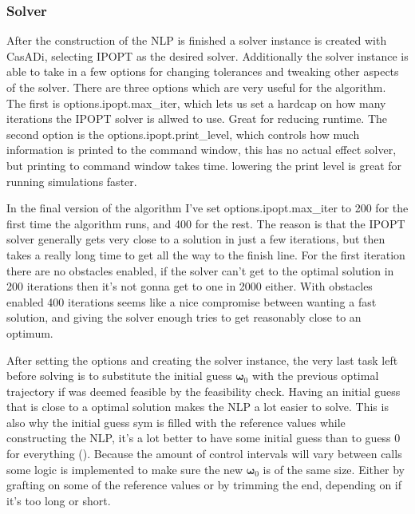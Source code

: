 \subsubsection*{Solver}
After the construction of the \gls{NLP} is finished a solver instance is created with CasADi, selecting \gls{IPOPT}
as the desired solver. Additionally the solver instance is able to take in a few options for changing tolerances
and tweaking other aspects of the solver. There are three options which are very useful for the algorithm. 
The first is options.ipopt.max\_iter, which lets us set a hardcap on how many iterations the \gls{IPOPT} solver is 
allwed to use. Great for reducing runtime. The second option is the options.ipopt.print\_level, which controls 
how much information is printed to the command window, this has no actual effect solver, 
but printing to command window takes time. lowering the print level is great for running simulations faster.

In the final version of the algorithm I've set options.ipopt.max\_iter to 200 for the first time 
the algorithm runs, and 400 for the rest. The reason is that the \gls{IPOPT} solver generally gets very close
to a solution in just a few iterations, but then takes a really long time to get all the way to the finish line.
For the first iteration there are no obstacles enabled, if the solver can't get to the optimal solution in 200 iterations
then it's not gonna get to one in 2000 either. With obstacles enabled 400 iterations seems like a nice compromise between
wanting a fast solution, and giving the solver enough tries to get reasonably close to an optimum. 

After setting the options and creating the solver instance, the very last task left before solving is to
substitute the initial guess $\bm{\omega}_0$ with the previous optimal trajectory if was deemed feasible
by the feasibility check. Having an initial guess that is close to a optimal solution makes the \gls{NLP}
a lot easier to solve. This is also why the initial guess sym is filled with the reference values while
constructing the NLP, it's a lot better to have some initial guess than to guess 0 for everything (\cite{gros2017Lecture}).
Because the amount of control intervals will vary between calls some logic is implemented to make sure the new
$\bm{\omega}_0$ is of the same size. Either by grafting on some of the reference values or by trimming the end, depending on
if it's too long or short.

